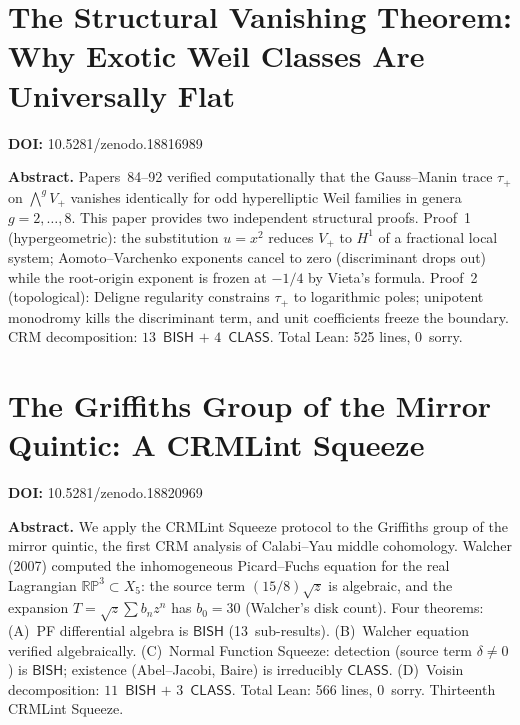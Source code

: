 \documentclass[11pt,a4paper]{article}
\begin{document}
\section{The Structural Vanishing Theorem: Why Exotic Weil Classes Are Universally Flat}
\label{sec:p93}
\textbf{DOI:} 10.5281/zenodo.18816989

\bigskip
\noindent\textbf{Abstract.}
Papers~84--92 verified computationally that the Gauss--Manin trace $\tau_+$ on $\bigwedge^g V_+$ vanishes identically for odd hyperelliptic Weil families in genera $g = 2,\ldots,8$. This paper provides two independent structural proofs. Proof~1 (hypergeometric): the substitution $u = x^2$ reduces $V_+$ to $H^1$ of a fractional local system; Aomoto--Varchenko exponents cancel to zero (discriminant drops out) while the root-origin exponent is frozen at $-1/4$ by Vieta's formula. Proof~2 (topological): Deligne regularity constrains $\tau_+$ to logarithmic poles; unipotent monodromy kills the discriminant term, and unit coefficients freeze the boundary. CRM decomposition: $13$~$\mathsf{BISH}$ $+$ $4$~$\mathsf{CLASS}$. Total Lean: 525 lines, 0~sorry.

\section{The Griffiths Group of the Mirror Quintic: A CRMLint Squeeze}
\label{sec:p94}
\textbf{DOI:} 10.5281/zenodo.18820969

\bigskip
\noindent\textbf{Abstract.}
We apply the CRMLint Squeeze protocol to the Griffiths group of the mirror quintic, the first CRM analysis of Calabi--Yau middle cohomology. Walcher (2007) computed the inhomogeneous Picard--Fuchs equation for the real Lagrangian $\mathbb{RP}^3 \subset X_5$: the source term $(15/8)\sqrt{z}$ is algebraic, and the expansion $T = \sqrt{z}\sum b_n z^n$ has $b_0 = 30$ (Walcher's disk count). Four theorems: (A)~PF differential algebra is $\mathsf{BISH}$ (13~sub-results). (B)~Walcher equation verified algebraically. (C)~Normal Function Squeeze: detection (source term $\delta \neq 0$) is $\mathsf{BISH}$; existence (Abel--Jacobi, Baire) is irreducibly $\mathsf{CLASS}$. (D)~Voisin decomposition: $11$~$\mathsf{BISH}$ $+$ $3$~$\mathsf{CLASS}$. Total Lean: 566 lines, 0~sorry. Thirteenth CRMLint Squeeze.

\newpage
\end{document}
